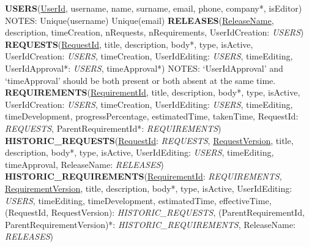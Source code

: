 \documentclass[12pt, a4paper]{report}
\begin{document}
\textbf{USERS}(\underline{UserId}, username, name, surname, email, phone, company*, isEditor)\newline
\newline
NOTES:\newline
Unique(username)\newline
Unique(email)\newline
\newline
\textbf{RELEASES}(\underline{ReleaseName}, description, timeCreation, nRequests, nRequirements,
UserIdCreation: \textit{USERS})\newline
\newline
\textbf{REQUESTS}(\underline{RequestId}, title, description, body*, type, isActive, UserIdCreation: \textit{USERS}, timeCreation,
UserIdEditing: \textit{USERS}, timeEditing, UserIdApproval*: \textit{USERS}, timeApproval*)\newline
\newline
NOTES:\newline
`UserIdApproval' and `timeApproval' should be both present or both absent at the same time.\newline
\newline
\textbf{REQUIREMENTS}(\underline{RequirementId}, title, description, body*, type, isActive, UserIdCreation: \textit{USERS},
timeCreation, UserIdEditing: \textit{USERS}, timeEditing, timeDevelopment, progressPercentage, estimatedTime, takenTime,
RequestId: \textit{REQUESTS}, ParentRequirementId*: \textit{REQUIREMENTS})\newline
\newline
\textbf{HISTORIC\_REQUESTS}(\underline{RequestId}: \textit{REQUESTS}, \underline{RequestVersion}, title, description, body*, type,
isActive, UserIdEditing: \textit{USERS}, timeEditing, timeApproval, ReleaseName: \textit{RELEASES})\newline
\newline
\textbf{HISTORIC\_REQUIREMENTS}(\underline{RequirementId}: \textit{REQUIREMENTS}, \underline{RequirementVersion}, title,
description, body*, type, isActive, UserIdEditing: \textit{USERS}, timeEditing,  timeDevelopment, estimatedTime, effectiveTime,
(RequestId, RequestVersion): \textit{HISTORIC\_REQUESTS},
(ParentRequirementId, ParentRequirementVersion)*: \textit{HISTORIC\_REQUIREMENTS}, ReleaseName: \textit{RELEASES})



\end{document}
